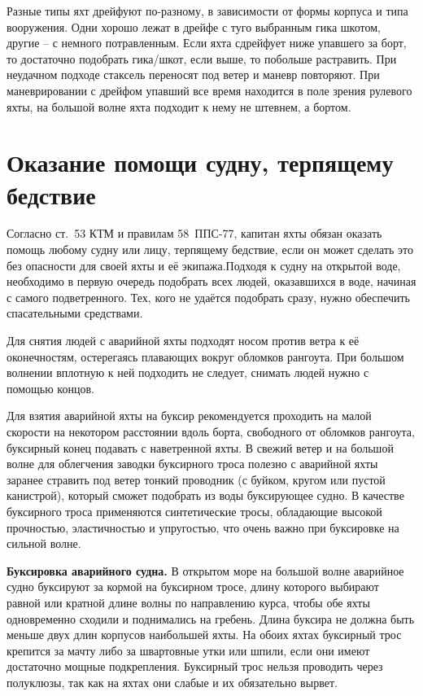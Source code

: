 Разные типы яхт дрейфуют по-разному, в зависимости от формы корпуса и
типа вооружения. Одни хорошо лежат в дрейфе с туго выбранным гика
шкотом, другие \--- с немного потравленным. Если яхта сдрейфует ниже
упавшего за борт, то достаточно подобрать гика\-/шкот, если выше, то
побольше растравить. При неудачном подходе стаксель переносят под
ветер и маневр повторяют. При маневрировании с дрейфом упавший все
время находится в поле зрения рулевого яхты, на большой волне яхта
подходит к нему не штевнем, а бортом.

\section{Оказание помощи судну, терпящему бедствие}

Согласно ст.~53 КТМ и правилам 58~ППС-77, капитан яхты обязан оказать
помощь любому судну или лицу, терпящему бедствие, если он может
сделать это без опасности для своей яхты и её экипажа.Подходя к судну
на открытой воде, необходимо в первую очередь подобрать всех людей,
оказавшихся в воде, начиная с самого подветренного. Тех, кого не
удаётся подобрать сразу, нужно обеспечить спасательными средствами.

Для снятия людей с аварийной яхты подходят носом против ветра к её
оконечностям, остерегаясь плавающих вокруг обломков рангоута. При
большом волнении вплотную к ней подходить не следует, снимать людей
нужно с помощью концов.

Для взятия аварийной яхты на буксир рекомендуется проходить на малой
скорости на некотором расстоянии вдоль борта, свободного от обломков
рангоута, буксирный конец подавать с наветренной яхты. В свежий ветер
и на большой волне для облегчения заводки буксирного троса полезно с
аварийной яхты заранее стравить под ветер тонкий проводник (с буйком,
кругом или пустой канистрой), который сможет подобрать из воды
буксирующее судно. В качестве буксирного троса применяются
синтетические тросы, обладающие высокой прочностью, эластичностью и
упругостью, что очень важно при буксировке на сильной волне.

\textbf{Буксировка аварийного судна.} В открытом море на большой волне
аварийное судно буксируют за кормой на буксирном тросе, длину которого
выбирают равной или кратной длине волны по направлению курса, чтобы
обе яхты одновременно сходили и поднимались на гребень. Длина буксира
не должна быть меньше двух длин корпусов наибольшей яхты. На обоих
яхтах буксирный трос крепится за мачту либо за швартовные утки или
шпили, если они имеют достаточно мощные подкрепления. Буксирный трос
нельзя проводить через полуклюзы, так как на яхтах они слабые и их
обязательно вырвет.

